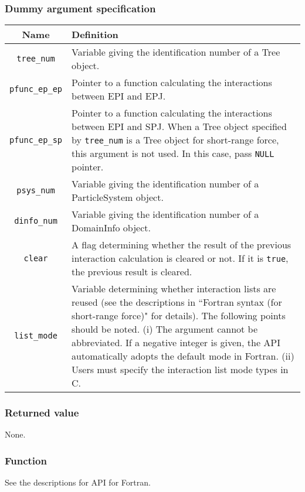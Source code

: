 \subsubsection*{Dummy argument specification}
\begin{table}[h]
\begin{tabularx}{\linewidth}{cX}
\toprule
\rowcolor{Snow2}
Name & Definition \\
\midrule
\verb|tree_num|    & Variable giving the identification number of a Tree object.\\
\verb|pfunc_ep_ep| & Pointer to a function calculating the interactions between EPI and EPJ. \\
\verb|pfunc_ep_sp| & Pointer to a function calculating the interactions between EPI and SPJ. When a Tree object specified by \verb|tree_num| is a Tree object for short-range force, this argument is not used. In this case, pass \texttt{NULL} pointer. \\
\verb|psys_num|    & Variable giving the identification number of a ParticleSystem object.\\
\verb|dinfo_num|   & Variable giving the identification number of a DomainInfo object.\\
\verb|clear|       & A flag determining whether the result of the previous interaction calculation is cleared or not. If it is \texttt{true}, the previous result is cleared. \\
\verb|list_mode|   & Variable determining whether interaction lists are reused (see the descriptions in ``Fortran syntax (for short-range force)" for details). The following points should be noted. (i) The argument cannot be abbreviated. If a negative integer is given, the API automatically adopts the default mode in Fortran. (ii) Users must specify the interaction list mode types in C. \\
\bottomrule
\end{tabularx}
\end{table}

\subsubsection*{Returned value}
None.

\subsubsection*{Function}
See the descriptions for API for Fortran.

\clearpage

